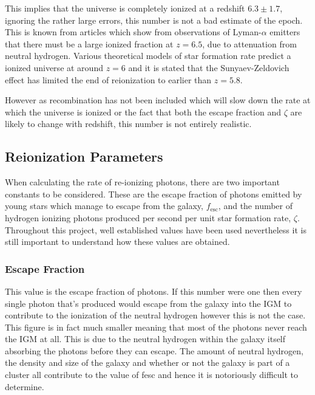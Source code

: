 	This implies that the universe is completely ionized at a redshift $6.3\pm1.7$, ignoring the rather large errors, this number is not a bad estimate of the epoch. This is known from articles which show from observations of Lyman-$\alpha$ emitters that there must be a large ionized fraction at $z=6.5$, due to attenuation from neutral hydrogen\cite{Ota:arXiv0707.1561}. Various theoretical models of star formation rate predict a ionized universe at around $z=6$ and it is stated that the Sunyaev-Zeldovich effect has limited the end of reionization to earlier than $z=5.8$\cite{2012MNRAS.423..862K}.

	However as recombination has not been included which will slow down the rate at which the universe is ionized or the fact that both the escape fraction and $\zeta$ are likely to change with redshift, this number is not entirely realistic.

	\subsection{Reionization Parameters} %
	\label{sub:reionization_parameters}
		When calculating the rate of re-ionizing photons, there are two important constants to be considered. These are the escape fraction of photons emitted by young stars which manage to escape from the galaxy, $f_\text{esc}$, and the number of hydrogen ionizing photons produced per second per unit star formation rate, $\zeta$. Throughout this project, well established values have been used nevertheless it is still important to understand how these values are obtained.

		\subsubsection{Escape Fraction} %
		\label{sub:escape_fraction}
			This value is the escape fraction of photons. If this number were one then every single photon that’s produced would escape from the galaxy into the IGM to contribute to the ionization of the neutral hydrogen however this is not the case. This figure is in fact much smaller meaning that most of the photons never reach the IGM at all. This is due to the neutral hydrogen within the galaxy itself absorbing the photons before they can escape. The amount of neutral hydrogen, the density and size of the galaxy and whether or not the galaxy is part of a cluster all contribute to the value of fesc and hence it is notoriously difficult to determine.


